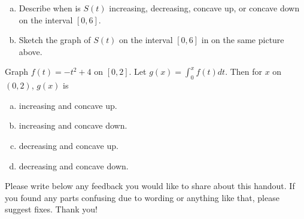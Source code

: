 \documentclass[answers]{exam}
\begin{document}
\begin{questions}
\begin{enumerate}[(a)]
	
	\item Describe when is $S(t)$ increasing, decreasing, concave up, or concave down on the interval $[0,6]$.
	
	\hfill \break
	\hfill \break
	\hfill \break
	
	\item Sketch the graph of $S(t)$ on the interval $[0,6]$ in on the same picture above. 
	
	
\end{enumerate}

\question Graph $f(t) = -t^2+4$ on $[0, 2]$. Let $g(x) = \int_0^x f(t) dt$. Then for $x$ on $(0, 2)$, $g(x)$ is 

\begin{enumerate}[(a)]
	
	\item increasing and concave up.
	
	
	\item increasing and concave down.
	
	\item decreasing and concave up.
	
	\item decreasing and concave down.
	
	
\end{enumerate}

\question Please write below any feedback you would like to share about this handout. If you found any parts confusing due to wording or anything like that, please suggest fixes. Thank you!

%
%
%	
%	
%	
%	
%	
%	
%	
%	
%	
%	
%	



\end{questions}
\end{document}
